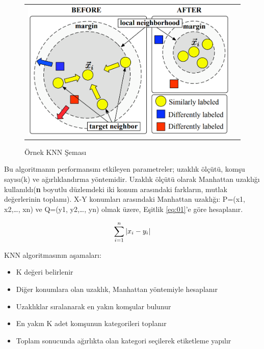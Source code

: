 \documentclass[conference]{IEEEtran}
\begin{document}
\begin{figure}[!h]
	\centering%
	\begin{center}
		\begin{tabular}{cc}%
			\includegraphics[scale=0.3]{pictures/pic_02.png}&%
		\end{tabular}%
	\end{center}
	\caption{Örnek KNN Şeması\cite{10}}%
	\label{fig:02}
\end{figure}

\quad Bu algoritmanın performansını etkileyen parametreler; uzaklık ölçütü, komşu sayısı(k) ve ağırlıklandırma yöntemidir\cite{7}. Uzaklık ölçütü olarak Manhattan uzaklığı kullanıldı(\textbf{n} boyutlu düzlemdeki iki konum arasındaki farkların, mutlak değerlerinin toplamı). X-Y konumları arasındaki Manhattan uzaklığı: P=(x1, x2,…, xn) ve Q=(y1, y2,…, yn) olmak üzere, Eşitlik \ref{eq:01}'e göre hesaplanır\cite{7}.

\begin{equation}
\label{eq:01}
\Large \sum_{i=1}^{n}\left | x_{i} - y_{i} \right |
\end{equation}

\pagebreak
KNN algoritmasının aşamaları\cite{9}:
\begin{itemize}
\item K değeri belirlenir
\item Diğer konumlara olan uzaklık, Manhattan yöntemiyle hesaplanır
\item Uzaklıklar sıralanarak en yakın komşular bulunur
\item En yakın K adet komşunun kategorileri toplanır
\item Toplam sonucunda ağırlıkta olan kategori seçilerek etiketleme yapılır
\end{itemize}
\end{document}
